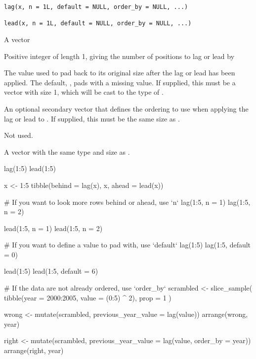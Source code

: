 \documentclass[a4paper]{book}
\begin{document}
%
\begin{Usage}
\begin{verbatim}
lag(x, n = 1L, default = NULL, order_by = NULL, ...)

lead(x, n = 1L, default = NULL, order_by = NULL, ...)
\end{verbatim}
\end{Usage}
%
\begin{Arguments}
\begin{ldescription}
\item[\code{x}] A vector

\item[\code{n}] Positive integer of length 1, giving the number of positions to
lag or lead by

\item[\code{default}] The value used to pad  back to its original size after the
lag or lead has been applied. The default, , pads with a missing
value. If supplied, this must be a vector with size 1, which will be cast
to the type of .

\item[\code{order\_by}] An optional secondary vector that defines the ordering to use
when applying the lag or lead to . If supplied, this must be the same
size as .

\item[\code{...}] Not used.
\end{ldescription}
\end{Arguments}
%
\begin{Value}
A vector with the same type and size as .
\end{Value}
%
\begin{Examples}
\begin{ExampleCode}
lag(1:5)
lead(1:5)

x <- 1:5
tibble(behind = lag(x), x, ahead = lead(x))

# If you want to look more rows behind or ahead, use `n`
lag(1:5, n = 1)
lag(1:5, n = 2)

lead(1:5, n = 1)
lead(1:5, n = 2)

# If you want to define a value to pad with, use `default`
lag(1:5)
lag(1:5, default = 0)

lead(1:5)
lead(1:5, default = 6)

# If the data are not already ordered, use `order_by`
scrambled <- slice_sample(
  tibble(year = 2000:2005, value = (0:5) ^ 2),
  prop = 1
)

wrong <- mutate(scrambled, previous_year_value = lag(value))
arrange(wrong, year)

right <- mutate(scrambled, previous_year_value = lag(value, order_by = year))
arrange(right, year)
\end{ExampleCode}
\end{Examples}
\end{document}
